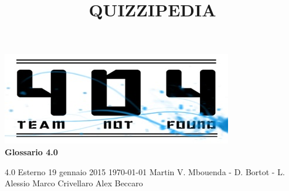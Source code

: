 \documentclass[a4paper,11pt]{article}
\title{\textbf{{\fontsize{8mm}{5mm}\selectfont QUIZZIPEDIA}}}
\begin{document}
	\maketitle
	\thispagestyle{empty}

	\begin{center}
		\includegraphics{../../team_not_found.jpg}\\
		\vspace{20mm}
		\textbf{{\Large Glossario 4.0}}	
	\end{center}

	\thispagestyle{empty}	%
			{4.0} 							%
			{Esterno} 						%
			{19 gennaio 2015} 				%
			{\today} 						%
			{Martin V. Mbouenda - D. Bortot - L. Alessio}		%
			{Marco Crivellaro} 			%
			{Alex Beccaro}					%
			
	\newpage
	\fancyfoot[R]{\thepage}
\end{document}
